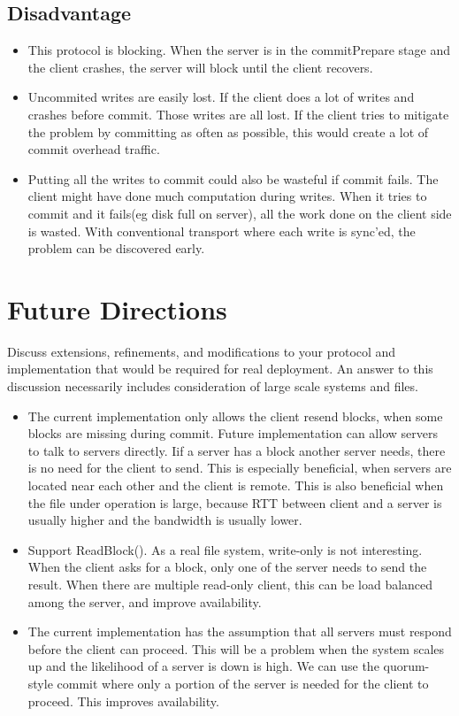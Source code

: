 \documentclass[11pt]{article} %
\begin{document}
\subsection{Disadvantage}
\begin{itemize}
\item This protocol is blocking. When the server is in the commitPrepare stage and
    the client crashes, the server will block until the client recovers.

\item Uncommited writes are easily lost. If the client does a lot of writes 
    and crashes before commit. Those writes are all lost. If the client tries
    to mitigate the problem by committing as often as possible, this would create
    a lot of commit overhead traffic.

\item Putting all the writes to commit could also be wasteful if commit fails.
    The client might have done much computation during writes. 
    When it tries to commit and it fails(eg disk full on server), 
    all the work done on the client side is wasted.
    With conventional transport where each write is sync'ed, the problem can
    be discovered early.
\end{itemize}

\section{Future Directions}
Discuss extensions, refinements, and modifications to your protocol and 
implementation that would be required for real deployment. 
An answer to this discussion necessarily includes consideration of large scale systems and files.

\begin{itemize}
\item The current implementation only allows the client resend blocks,
    when some blocks are missing during commit. 
    Future implementation can allow servers to talk to servers directly.
    Iif a server has a block another server needs, 
    there is no need for the client to send.
    This is especially beneficial, when servers are located near each other
    and the client is remote. 
    This is also beneficial when the file under operation is large, because
    RTT between client and a server is usually higher and the bandwidth is 
    usually lower.

\item Support ReadBlock(). As a real file system, write-only is not interesting.
    When the client asks for a block, only one of the server needs to send the result.
    When there are multiple read-only client, this can be load balanced among
    the server, and improve availability.

\item The current implementation has the assumption that all servers must respond
    before the client can proceed. This will be a problem when the system scales up
    and the likelihood of a server is down is high. We can use the quorum-style 
    commit where only a portion of the server is needed for the client to proceed.
    This improves availability.
\end{itemize}
\end{document}
